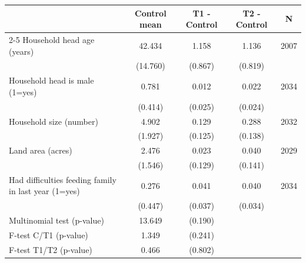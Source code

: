 \begin{tabular}{lcccc}
\hline\hline
 & Control mean & T1 - Control & T2 - Control & N \\
\cline{2-5}
Household head age (years) & 42.434 & 1.158 & 1.136 & 2007 \\
 & (14.760) & (0.867) & (0.819) & \\
Household head is male (1=yes) & 0.781 & 0.012 & 0.022 & 2034 \\
 & (0.414) & (0.025) & (0.024) & \\
Household size (number) & 4.902 & 0.129 & 0.288 & 2032 \\
 & (1.927) & (0.125) & (0.138) & \\
Land area (acres) & 2.476 & 0.023 & 0.040 & 2029 \\
 & (1.546) & (0.129) & (0.141) & \\
Had difficulties feeding family in last year (1=yes) & 0.276 & 0.041 & 0.040 & 2034 \\
 & (0.447) & (0.037) & (0.034) & \\
\hline
Multinomial test (p-value) & 13.649 & (0.190) & & \\
F-test C/T1 (p-value) & 1.349 & (0.241) & & \\
F-test T1/T2 (p-value) & 0.466 & (0.802) & & \\
\hline\hline
\end{tabular}
